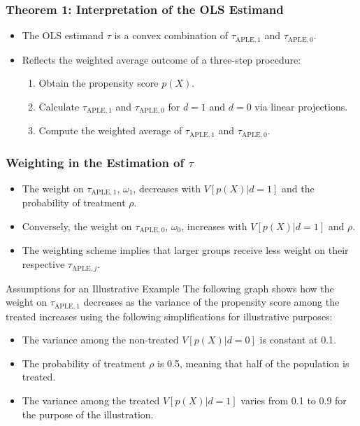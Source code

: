 \begin{frame}
\frametitle{Theorem 1: Interpretation of the OLS Estimand}
\begin{itemize}
    \item The OLS estimand \( \tau \) is a convex combination of \( \tau_{\text{APLE},1} \) and \( \tau_{\text{APLE},0} \).
    \item Reflects the weighted average outcome of a three-step procedure:
    \begin{enumerate}
        \item Obtain the propensity score \( p(X) \).
        \item Calculate \( \tau_{\text{APLE},1} \) and \( \tau_{\text{APLE},0} \) for \( d = 1 \) and \( d = 0 \) via linear projections.
        \item Compute the weighted average of \( \tau_{\text{APLE},1} \) and \( \tau_{\text{APLE},0} \).
    \end{enumerate}
\end{itemize}
\end{frame}

\begin{frame}
\frametitle{Weighting in the Estimation of \( \tau \)}
\begin{itemize}
    \item The weight on \( \tau_{\text{APLE},1} \), \( \omega_1 \), decreases with \( V[p(X) | d = 1] \) and the probability of treatment \( \rho \).
    \item Conversely, the weight on \( \tau_{\text{APLE},0} \), \( \omega_0 \), increases with \( V[p(X) | d = 1] \) and \( \rho \).
    \item The weighting scheme implies that larger groups receive less weight on their respective \( \tau_{\text{APLE},j} \).
\end{itemize}
\end{frame}

\begin{frame}{Assumptions for an Illustrative Example}
    The following graph shows how the weight on \( \tau_{\text{APLE},1} \) decreases as the variance of the propensity score among the treated increases using the following simplifications for illustrative purposes:
    \begin{itemize}
        \item The variance among the non-treated \( V[p(X) | d = 0] \) is constant at 0.1.
        \item The probability of treatment \( \rho \) is 0.5, meaning that half of the population is treated.
        \item The variance among the treated \( V[p(X) | d = 1] \) varies from 0.1 to 0.9 for the purpose of the illustration.
    \end{itemize}
\end{frame}

